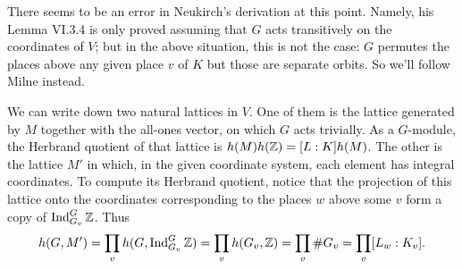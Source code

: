  There seems to be an error in Neukirch's derivation at this
point. Namely, his Lemma VI.3.4 is only proved assuming that $G$ acts
transitively on the coordinates of $V$; but in the above situation,
this is not the case: $G$ permutes the places above any given place $v$
of $K$ but those are separate orbits. So we'll follow Milne instead.

We can write down two natural lattices in $V$. One of them is the lattice
generated by $M$ together with the all-ones vector, on which $G$ acts
trivially. As a $G$-module, the Herbrand quotient of that lattice is
$h(M) h(\mathbb{Z}) = [L:K] h(M)$. The other is the lattice $M'$ in which, in the
given coordinate system, each element has integral coordinates. To
compute its Herbrand quotient, notice that the projection of this 
lattice onto the coordinates corresponding to the places $w$ above some
$v$ form a copy of $\operatorname{Ind}^G_{G_v} \mathbb{Z}$. Thus
\[
h(G, M') = \prod_v h(G, \operatorname{Ind}^G_{G_v} \mathbb{Z}) = \prod_v h(G_v, \mathbb{Z})
= \prod_v \#G_v = \prod_v [L_w:K_v].
\]

